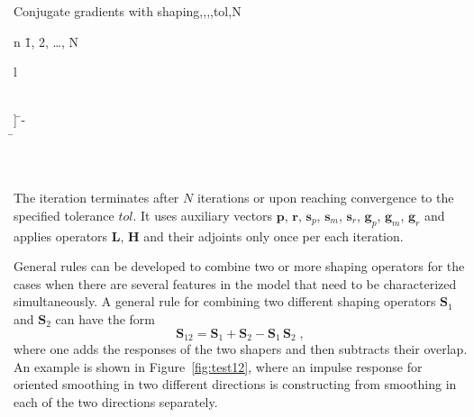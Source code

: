 \begin{algorithm}{Conjugate gradients with shaping}{,,,\lambda,tol,N}
\begin{FOR}{n \= 1, 2, \ldots, N}
\begin{array}{l}
         \\
         \\
      \end{array}\right] \= 
     - \alpha\,
     \\
    \hat{\rho} \= \rho
  \end{FOR} \\        
  \RETURN {}
\end{algorithm}
  
The iteration terminates after $N$ iterations or upon reaching convergence
to the specified tolerance $tol$. It uses auxiliary vectors $\mathbf{p}$,
$\mathbf{r}$, $\mathbf{s}_p$, $\mathbf{s}_m$, $\mathbf{s}_r$, $\mathbf{g}_p$,
$\mathbf{g}_m$, $\mathbf{g}_r$ and applies operators $\mathbf{L}$,
$\mathbf{H}$ and their adjoints only once per each iteration.




General rules can be developed to combine two or more shaping operators for
the cases when there are several features in the model that need to be
characterized simultaneously. A general rule for combining two different
shaping operators $\mathbf{S}_1$ and $\mathbf{S}_2$ can have the form
\begin{equation}
  \label{eq:combine}
  \mathbf{S}_{12} =
  \mathbf{S}_{1} + \mathbf{S}_{2} -
  \mathbf{S}_{1}\,\mathbf{S}_{2}\;,
\end{equation}
where one adds the responses of the two shapers and then subtracts
their overlap. An example is shown in Figure~\ref{fig:test12}, where
an impulse response for oriented smoothing in two different directions
is constructing from smoothing in each of the two directions
separately.


